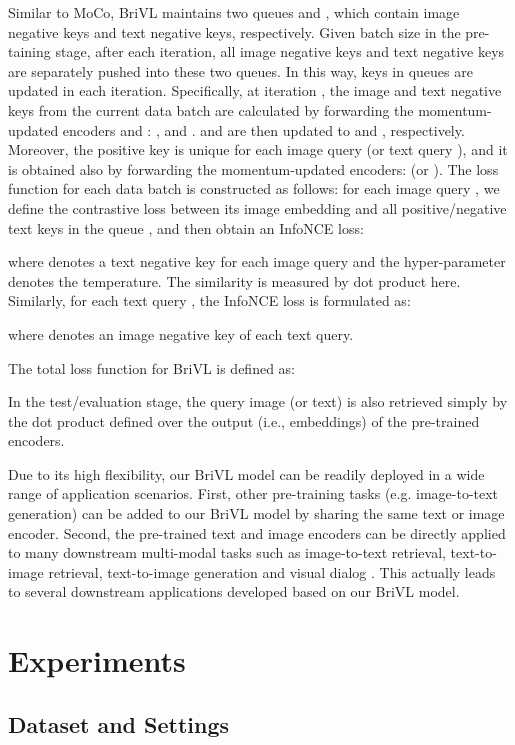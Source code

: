 \documentclass[10pt,twocolumn,letterpaper]{article}
\begin{document}
Similar to MoCo, BriVL maintains two queues  and , which contain  image negative keys and  text negative keys, respectively. Given batch size  in the pre-taining stage, after each iteration, all  image negative keys and  text negative keys are separately pushed into these two queues. In this way, keys in queues are updated in each iteration. Specifically, at iteration , the image and text negative keys from the current data batch  are calculated by forwarding the momentum-updated encoders  and : , and .  and  are then updated to  and , respectively. Moreover, the positive key is unique for each image query  (or text query ), and it is obtained also by forwarding the momentum-updated encoders:  (or ). The loss function for each data batch is constructed as follows: for each image query , we define the contrastive loss between its image embedding  and all positive/negative text keys in the queue , and then obtain an InfoNCE loss:

where  denotes a text negative key for each image query and the hyper-parameter  denotes the temperature. The similarity is measured by dot product here. Similarly, for each text query , the InfoNCE loss is formulated as:

where  denotes an image negative key of each text query.



The total loss function for BriVL is defined as:

In the test/evaluation stage, the query image (or text) is also retrieved simply by the dot product defined over the output (i.e., embeddings) of the pre-trained encoders.

Due to its high flexibility, our BriVL model can be readily deployed in a wide range of application scenarios. First, other pre-training tasks (e.g. image-to-text generation) can be added to our BriVL model by sharing the same text or image encoder. Second, the pre-trained text and image encoders can be directly applied to many downstream multi-modal tasks such as image-to-text retrieval, text-to-image retrieval, text-to-image generation \cite{reed2016generative} and visual dialog \cite{niu2019recursive}. This actually leads to several downstream applications developed based on our BriVL model.

\section{Experiments}

\subsection{Dataset and Settings}
\end{document}

